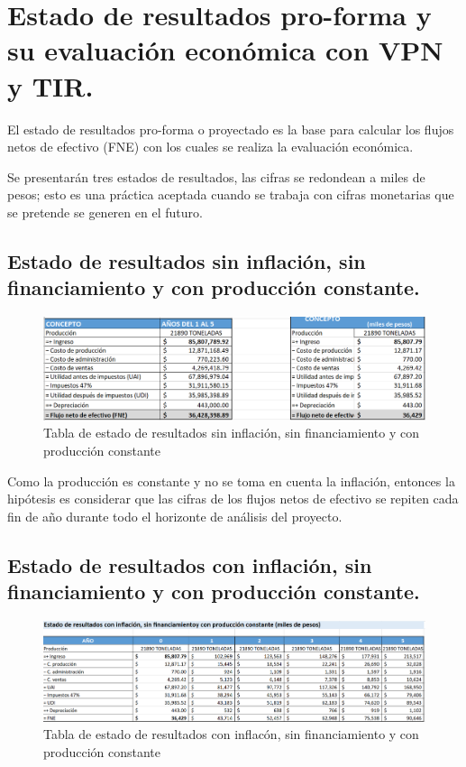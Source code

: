 \section{Estado de resultados pro-forma y su evaluación económica con VPN y TIR.}

El estado de resultados pro-forma o proyectado es la base para calcular los flujos netos de efectivo (FNE) con los cuales se realiza la evaluación económica.

Se presentarán tres estados de resultados, las cifras se redondean a miles de pesos; esto es una práctica aceptada cuando
se trabaja con cifras monetarias que se pretende se generen en el futuro.

\subsection{ Estado de resultados sin inflación, sin financiamiento y con producción constante. }

\begin{figure}[H]
    \centering	
    \includegraphics[width=1.1\textwidth]{chapters/ELC_13.png} 
    \caption{Tabla de estado de resultados sin inflación, sin financiamiento y con producción constante}
\label{fig:croquis190125}
\end{figure}

Como la producción es constante y no se toma en cuenta la inflación, entonces la hipótesis es considerar que las cifras de los flujos netos de efectivo se repiten cada fin de año durante todo el horizonte de análisis del proyecto.


\subsection{Estado de resultados con inflación, sin financiamiento y con producción constante.}

\begin{figure}[H]
    \centering	
    \includegraphics[width=1.1\textwidth]{chapters/ELC_14.png} 
    \caption{Tabla de estado de resultados con inflacón, sin financiamiento y con producción constante}
\label{fig:croquis190125}
\end{figure}

